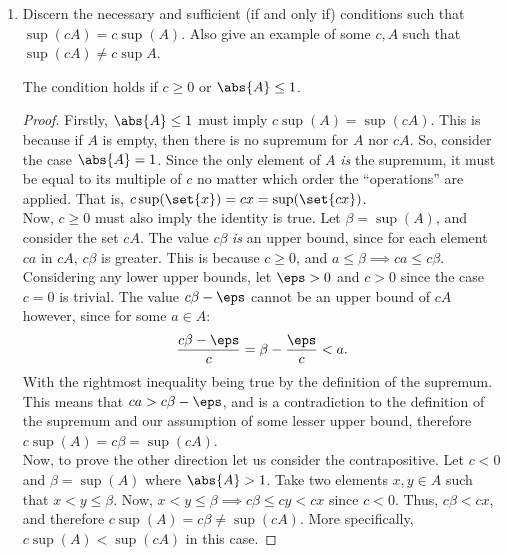 \documentclass{article}
\begin{document}
\begin{enumerate}
\begin{enumerate}
          \item Discern the necessary and sufficient (if and only if) conditions such that $\sup(cA) = c\sup(A)$.
                Also give an example of some $c, A$ such that $\sup(cA) \ne c \sup A$.

                The condition holds if $c \ge 0$ or $\abs{A} \le 1$.
                \begin{proof}
                  Firstly, $\abs{A} \le 1$ must imply $c\sup(A) = \sup(cA)$.
                  This is because if $A$ is empty, then there is no supremum for $A$ nor $cA$.
                  So, consider the case $\abs{A} = 1$.
                  Since the only element of $A$ \textit{is} the supremum, it must be equal to its multiple of $c$
                  no matter which order the ``operations'' are applied.
                  That is, $c \sup(\set{x}) = cx = \sup(\set{cx})$.\\

                  Now, $c \ge 0$ must also imply the identity is true. Let $\beta = \sup(A)$, and consider the set $cA$.
                  The value $c\beta$ \textit{is} an upper bound, since for each element $ca$ in $cA$, $c\beta$ is greater.
                  This is because $c \ge 0$, and $a \le \beta \implies ca \le c\beta$.\\

                  Considering any lower upper bounds, let $\eps > 0$ and $c > 0$ since the case $c = 0$ is trivial.
                  The value $c\beta - \eps$ cannot be an upper bound of $cA$ however,
                  since for some $a \in A$:
                  \begin{equation*}
                    \frac{c\beta - \eps}{c} = \beta - \frac{\eps}{c} < a.
                  \end{equation*}
                  With the rightmost inequality being true by the definition of the supremum.
                  This means that $ca > c\beta - \eps$, and is a contradiction to the definition of the supremum
                  and our assumption of some lesser upper bound,
                  therefore $c\sup(A) = c\beta = \sup(cA)$.\\

                  Now, to prove the other direction let us consider the contrapositive.
                  Let $c < 0$ and $\beta = \sup(A)$ where $\abs{A} > 1$.
                  Take two elements $x, y \in A$ such that $x < y \le \beta$.
                  Now, $x < y \le \beta \implies c\beta \le cy < cx$ since $c < 0$.
                  Thus, $c\beta < cx$, and therefore $c\sup(A) = c\beta \ne \sup(cA)$.
                  More specifically, $c\sup(A) < \sup(cA)$ in this case.
                \end{proof}



\end{enumerate}
\end{enumerate}
\end{document}
